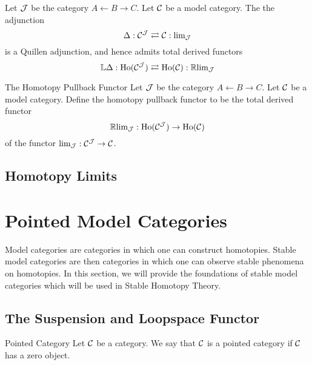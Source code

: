 \documentclass[a4paper]{article}
\begin{document}
\begin{thm}{}{} Let $\mathcal{J}$ be the category $A\leftarrow B\rightarrow C$. Let $\mathcal{C}$ be a model category. The the adjunction $$\Delta:\mathcal{C}^{\mathcal{J}}\rightleftarrows\mathcal{C}:\text{lim}_{\mathcal{J}}$$ is a Quillen adjunction, and hence admits total derived functors $$\mathbb{L}\Delta:\text{Ho}(\mathcal{C}^{\mathcal{J}})\rightleftarrows\text{Ho}(\mathcal{C}):\mathbb{R}\text{lim}_{\mathcal{J}}$$
\end{thm}

\begin{defn}{The Homotopy Pullback Functor}{} Let $\mathcal{J}$ be the category $A\leftarrow B\rightarrow C$. Let $\mathcal{C}$ be a model category. Define the homotopy pullback functor to be the total derived functor $$\mathbb{R}\text{lim}_{\mathcal{J}}:\text{Ho}(\mathcal{C}^{\mathcal{J}})\to\text{Ho}(\mathcal{C})$$ of the functor $\text{lim}_{\mathcal{J}}:\mathcal{C}^{\mathcal{J}}\to\mathcal{C}$. 
\end{defn}

\subsection{Homotopy Limits}

\pagebreak
\section{Pointed Model Categories}
Model categories are categories in which one can construct homotopies. Stable model categories are then categories in which one can observe stable phenomena on homotopies. In this section, we will provide the foundations of stable model categories which will be used in Stable Homotopy Theory. 

\subsection{The Suspension and Loopspace Functor}
\begin{defn}{Pointed Category}{} Let $\mathcal{C}$ be a category. We say that $\mathcal{C}$ is a pointed category if $\mathcal{C}$ has a zero object. 
\end{defn}
\end{document}
